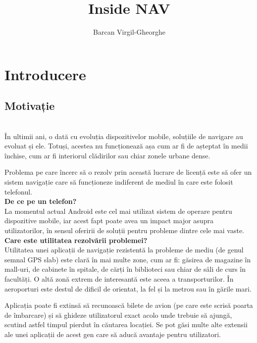 \documentclass[12pt,a4paper]{article}
\title{Inside NAV}
\author{Barcan Virgil-Gheorghe}
\begin{document}
\maketitle

\tableofcontents

\newpage
\section{Introducere}
\subsection{Motivație}
\\
În ultimii ani, o dată cu evoluția dispozitivelor mobile, soluțiile de navigare au evoluat și ele. Totuși, acestea nu funcționează așa cum ar fi de așteptat în medii închise, cum ar fi interiorul clădirilor sau chiar zonele urbane dense.

Problema pe care încerc să o rezolv prin această lucrare de licență este să ofer un sistem navigație care să funcționeze indiferent de mediul în care este folosit telefonul.\\

\textbf{De ce pe un telefon?}\\
La momentul actual Android este cel mai utilizat sistem de operare pentru dispozitive mobile, iar acest fapt poate avea un impact major asupra utilizatorilor, în sensul oferirii de soluții pentru probleme dintre cele mai vaste.\\

\textbf{Care este utilitatea rezolvării problemei?}\\
Utilitatea unei aplicații de navigație rezistentă la probleme de mediu (de genul semnal GPS slab) este clară în mai multe zone, cum ar fi: găsirea de magazine în mall-uri, de cabinete în spitale, de cărți în biblioteci sau chiar de săli de curs în facultăți. O altă zonă extrem de interesantă este aceea a transporturilor. În aeroporturi este destul de dificil de orientat, la fel și la metrou sau în gările mari. 

Aplicația poate fi extinsă să recunoască bilete de avion (pe care este scrisă poarta de îmbarcare) și să ghideze utilizatorul exact acolo unde trebuie să ajungă, scutind astfel timpul pierdut în căutarea locației. Se pot găsi multe alte extensii ale unei aplicații de acest gen care să aducă avantaje pentru utilizatori.
\end{document}
